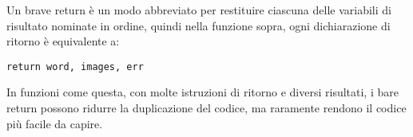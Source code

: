 \documentclass[../../thesis.tex]{subfiles}
\begin{document}
    Un brave return è un modo abbreviato per restituire ciascuna delle variabili di risultato nominate in ordine, quindi nella funzione sopra, ogni dichiarazione di ritorno è equivalente a:
    \begin{lstlisting}[frame = single,label={lst:lstlisting4-3.6}]
return word, images, err
    \end{lstlisting}
    In funzioni come questa, con molte istruzioni di ritorno e diversi risultati, i bare return possono ridurre la duplicazione del codice, ma raramente rendono il codice più facile da capire.
\end{document}

